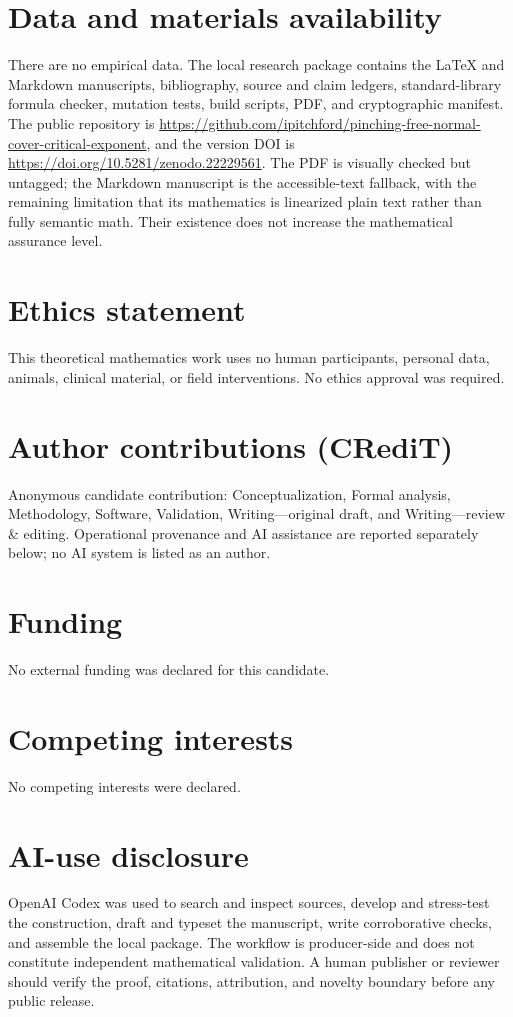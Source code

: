 \documentclass[11pt]{article}
\theoremstyle{definition}
\begin{document}
\section*{Data and materials availability}

There are no empirical data.  The local research package contains the LaTeX
and Markdown manuscripts, bibliography, source and claim ledgers,
standard-library formula checker, mutation tests, build scripts, PDF, and
cryptographic manifest.  The public repository is
\url{https://github.com/ipitchford/pinching-free-normal-cover-critical-exponent},
and the version DOI is \url{https://doi.org/10.5281/zenodo.22229561}.
The PDF is visually checked but untagged; the Markdown
manuscript is the accessible-text fallback, with the remaining limitation that
its mathematics is linearized plain text rather than fully semantic math.
Their existence does not increase the mathematical assurance level.

\section*{Ethics statement}

This theoretical mathematics work uses no human participants, personal data,
animals, clinical material, or field interventions.  No ethics approval was
required.

\section*{Author contributions (CRediT)}

Anonymous candidate contribution: Conceptualization, Formal analysis,
Methodology, Software, Validation, Writing---original draft,
and Writing---review \& editing.  Operational provenance and AI assistance are
reported separately below; no AI system is listed as an author.

\section*{Funding}

No external funding was declared for this candidate.

\section*{Competing interests}

No competing interests were declared.

\section*{AI-use disclosure}

OpenAI Codex was used to search and inspect sources, develop and stress-test
the construction, draft and typeset the manuscript, write corroborative
checks, and assemble the local package.  The workflow is producer-side and
does not constitute independent mathematical validation.  A human publisher
or reviewer should verify the proof, citations, attribution, and novelty
boundary before any public release.



\end{document}
